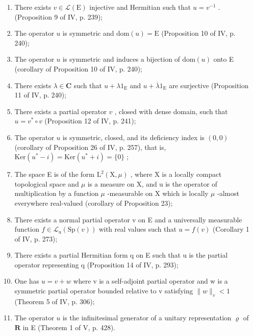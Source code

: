 \begin{enumerate}
\def\labelenumi{(\roman{enumi})}
\item
  There exists \(v \in \mathcal{L}(\mathrm{E})\) injective and Hermitian such that \(u = v^{-1}\) . (Proposition 9 of IV, p. 239);
\item
  The operator \(u\) is symmetric and \(\mathrm{dom}(u) = \mathrm{E}\) (Proposition 10 of IV, p. 240);
\item
  The operator \(u\) is symmetric and induces a bijection of \(\mathrm{dom}(u)\) onto E (corollary of Proposition 10 of IV, p. 240);
\item
  There exists \(\lambda \in \mathbf{C}\) such that \(u + \lambda 1_{\mathrm{E}}\) and \(u + \overline{\lambda} 1_{\mathrm{E}}\) are surjective (Proposition 11 of IV, p. 240);
\item
  There exists a partial operator \(v\) , closed with dense domain, such that \(u = v^{*} \circ v\) (Proposition 12 of IV, p. 241);
\item
  The operator \(u\) is symmetric, closed, and its deficiency index is \((0,0)\) (corollary of Proposition 26 of IV, p. 257), that is, \(\mathrm{Ker}(u^{*} - i) = \mathrm{Ker}(u^{*} + i) = \{0\}\) ;
\item
  The space E is of the form \(\mathrm{L}^{2}(\mathrm{X},\mu)\) , where X is a locally compact topological space and \(\mu\) is a measure on X, and u is the operator of multiplication by a function \(\mu\) -measurable on X which is locally \(\mu\) -almost everywhere real-valued (corollary of Proposition 23);
\item
  There exists a normal partial operator v on E and a universally measurable function \(f \in \mathcal{L}_{\mathrm{u}}(\mathrm{Sp}(v))\) with real values such that \(u = f(v)\) (Corollary 1 of IV, p. 273);
\item
  There exists a partial Hermitian form q on E such that u is the partial operator representing q (Proposition 14 of IV, p. 293);
\item
  One has \(u = v + w\) where v is a self-adjoint partial operator and w is a symmetric partial operator bounded relative to v satisfying \(\|w\|_{v} < 1\) (Theorem 5 of IV, p. 306);
\item
  The operator \(u\) is the infinitesimal generator of a unitary representation \(\varrho\) of \(\mathbf{R}\) in E (Theorem 1 of V, p. 428).
\end{enumerate}
